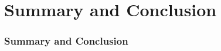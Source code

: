 \documentclass[ucs,10pt]{beamer}
\begin{document}
\section{Summary and Conclusion}

\begin{frame}
\frametitle{Summary and Conclusion}
\end{frame}
\end{document}
